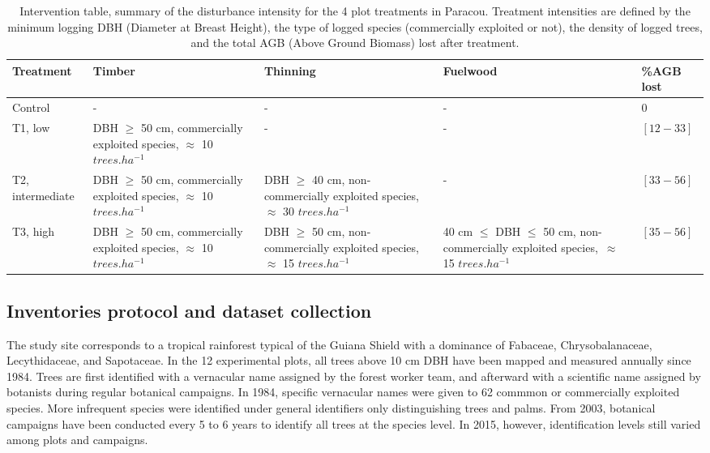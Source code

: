 \documentclass[fleqn,10pt]{ArtEcoFoG} %
\begin{document}
\begin{table*}[t]

\caption{\label{tab:Tab1}Intervention table, summary of the disturbance intensity for the 4 plot treatments in Paracou. Treatment intensities are defined by the minimum logging DBH (Diameter at Breast Height), the type of logged species (commercially exploited or not), the density of logged trees, and the total AGB (Above Ground Biomass) lost after treatment.}
\centering
\begin{tabu} to 
\toprule
Treatment & Timber & Thinning & Fuelwood & \%AGB lost\\
\midrule
Control & - & - & - & 0\\
T1, low & DBH $\geq$ 50 cm, commercially exploited species, $\approx$ 10   $trees.ha^{-1}$ & - & - & $[12-33]$\\
T2, intermediate & DBH $\geq$ 50 cm, commercially exploited species, $\approx$ 10  $trees.ha^{-1}$ & DBH $\geq$ 40 cm, non-commercially exploited species, $\approx$ 30   $trees.ha^{-1}$ & - & $[33-56]$\\
T3, high & DBH $\geq$ 50 cm, commercially exploited species, $\approx$ 10  $trees.ha^{-1}$ & DBH $\geq$ 50 cm, non-commercially exploited species, $\approx$ 15  $trees.ha^{-1}$ & 40 cm $\leq$ DBH $\leq$ 50 cm, non-commercially exploited species,\ $\approx$ 15 $trees.ha^{-1}$ & $[35-56]$\\
\bottomrule
\end{tabu}
\end{table*}\ignorespacesafterend

\hypertarget{inventories-protocol-and-dataset-collection}{%
\subsection{Inventories protocol and dataset collection}\label{inventories-protocol-and-dataset-collection}}

The study site corresponds to a tropical rainforest typical of the Guiana Shield with a dominance of Fabaceae, Chrysobalanaceae, Lecythidaceae, and Sapotaceae.
In the 12 experimental plots, all trees above 10 cm DBH have been mapped and measured annually since 1984.
Trees are first identified with a vernacular name assigned by the forest worker team, and afterward with a scientific name assigned by botanists during regular botanical campaigns.
In 1984, specific vernacular names were given to 62 commmon or commercially exploited species.
More infrequent species were identified under general identifiers only distinguishing trees and palms.
From 2003, botanical campaigns have been conducted every 5 to 6 years to identify all trees at the species level.
In 2015, however, identification levels still varied among plots and campaigns.
\end{document}
